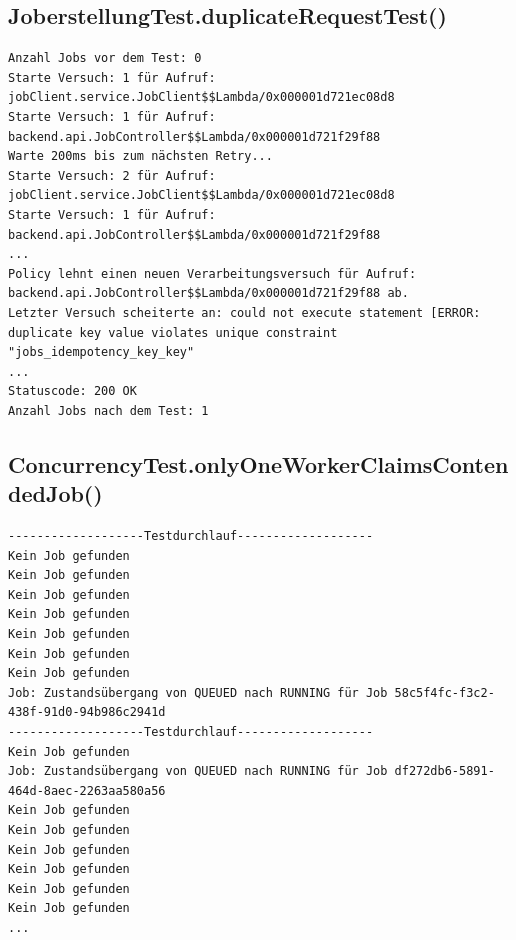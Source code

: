 \subsection*{JoberstellungTest.duplicateRequestTest()}
\label{subsec:testlog_z2}
\begin{lstlisting}[language={}, style=logs, numbers=none]
Anzahl Jobs vor dem Test: 0
Starte Versuch: 1 für Aufruf: jobClient.service.JobClient$$Lambda/0x000001d721ec08d8
Starte Versuch: 1 für Aufruf: backend.api.JobController$$Lambda/0x000001d721f29f88
Warte 200ms bis zum nächsten Retry...
Starte Versuch: 2 für Aufruf: jobClient.service.JobClient$$Lambda/0x000001d721ec08d8
Starte Versuch: 1 für Aufruf: backend.api.JobController$$Lambda/0x000001d721f29f88
...
Policy lehnt einen neuen Verarbeitungsversuch für Aufruf: backend.api.JobController$$Lambda/0x000001d721f29f88 ab.
Letzter Versuch scheiterte an: could not execute statement [ERROR: duplicate key value violates unique constraint "jobs_idempotency_key_key"
...
Statuscode: 200 OK
Anzahl Jobs nach dem Test: 1
\end{lstlisting}

\subsection*{ConcurrencyTest.onlyOneWorkerClaimsContendedJob()}
\label{subsec:testlog_z3_a}
\begin{lstlisting}[language={}, style=logs, numbers=none]
-------------------Testdurchlauf-------------------
Kein Job gefunden
Kein Job gefunden
Kein Job gefunden
Kein Job gefunden
Kein Job gefunden
Kein Job gefunden
Kein Job gefunden
Job: Zustandsübergang von QUEUED nach RUNNING für Job 58c5f4fc-f3c2-438f-91d0-94b986c2941d
-------------------Testdurchlauf-------------------
Kein Job gefunden
Job: Zustandsübergang von QUEUED nach RUNNING für Job df272db6-5891-464d-8aec-2263aa580a56
Kein Job gefunden
Kein Job gefunden
Kein Job gefunden
Kein Job gefunden
Kein Job gefunden
Kein Job gefunden
...
\end{lstlisting}

